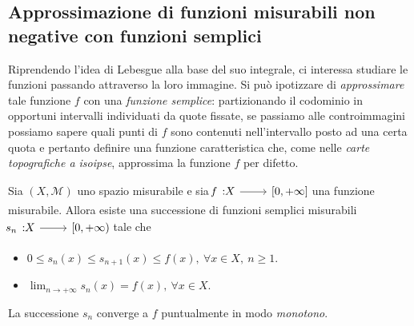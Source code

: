 \subsection{Approssimazione di funzioni misurabili non negative con funzioni semplici}
Riprendendo l'idea di Lebesgue alla base del suo integrale, ci interessa studiare le funzioni passando attraverso la loro immagine. Si può ipotizzare di \textit{approssimare} tale funzione $f$ con una \textit{funzione semplice}: partizionando il codominio in opportuni intervalli individuati da quote fissate, se passiamo alle controimmagini possiamo sapere quali punti di $f$ sono contenuti nell'intervallo posto ad una certa quota e pertanto definire una funzione caratteristica che, come nelle \textit{carte topografiche a isoipse}, approssima la funzione $f$ per difetto.
\begin{theorema}
	Sia $\left(X,\mathcal{M}\right)$ uno spazio misurabile e sia $\funz{f}{X}{\left[0,+\infty\right]}$ una funzione misurabile. Allora esiste una successione di funzioni semplici misurabili $\funz{s_n}{X}{\left[0,+\infty\right)}$ tale che
	\begin{itemize}
		\item $0\leq s_n\left(x\right)\leq s_{n+1}\left(x\right)\leq f\left(x\right),\ \forall x\in X,\ n\geq 1$.
		\item $\displaystyle\lim_{n\to+\infty}s_n\left(x\right)=f\left(x\right),\ \forall x\in X$.
	\end{itemize}
\end{theorema}
\begin{observe}
	La successione $s_n$ converge a $f$ puntualmente in modo \textit{monotono}.
\end{observe}
